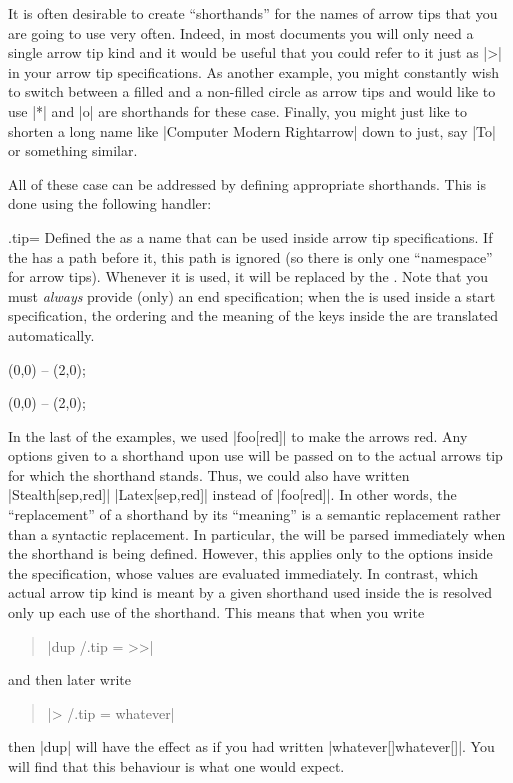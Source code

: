 It is often desirable to create ``shorthands'' for the names of arrow
tips that you are going to use very often. Indeed, in most documents
you will only need a single arrow tip kind and it would be useful that
you could refer to it just as |>| in your arrow tip specifications. As
another example, you might constantly wish to switch between a filled
and a non-filled circle as arrow tips and would like to use |*| and
|o| are shorthands for these case. Finally, you might just like to
shorten a long name like |Computer Modern Rightarrow| down to just,
say |To| or something similar.

All of these case can be addressed by defining appropriate
shorthands. This is done using the following handler:

\begin{handler}{{.tip}{=}}
  Defined the  as a name that can be used inside arrow tip
  specifications. If the  has a path before it, this path is
  ignored (so there is only one ``namespace'' for arrow
  tips). Whenever it is used, it will be replaced by the   . Note that you must \emph{always} provide
  (only) an end specification; when the  is used inside a
  start specification, the ordering and the meaning of the keys inside
  the  are translated automatically.

\begin{codeexample}[]
\tikz [foo /.tip = {Stealth[sep]. >>}]
  \draw [-foo] (0,0) -- (2,0);  
\end{codeexample}
\begin{codeexample}[]
\tikz [foo /.tip = {Stealth[sep] Latex[sep]},
       bar /.tip = {Stealth[length=10pt,open]}]
   (0,0) -- (2,0);  
\end{codeexample}

  In the last of the examples, we used |foo[red]| to make the arrows
  red. Any options given to a shorthand upon use will be passed on to
  the actual arrows tip for which the shorthand stands. Thus, we could
  also have written |Stealth[sep,red]| |Latex[sep,red]| instead of
  |foo[red]|. In other words, the ``replacement'' of a shorthand by
  its ``meaning'' is a semantic replacement rather than a syntactic
  replacement. In particular, the  will be
  parsed immediately when the shorthand is being defined. However,
  this applies only to the options inside the specification, whose
  values are evaluated immediately. In contrast, which actual arrow
  tip kind is meant by a given shorthand used inside the  is resolved only up each use of the shorthand. This
  means that when you write
  \begin{quote}
    |dup /.tip = >>|
  \end{quote}
  and then later write
  \begin{quote}
    |> /.tip = whatever|
  \end{quote}
  then |dup| will have the effect as if you had written
  |whatever[]whatever[]|. You will find that this behaviour is 
  what one would expect.


\end{handler}
